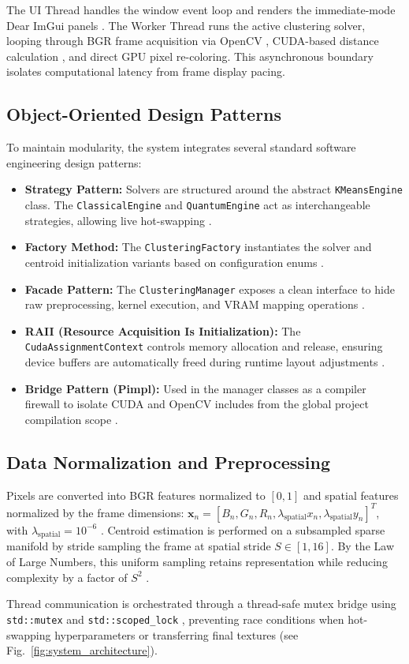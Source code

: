 The UI Thread handles the window event loop and renders the immediate-mode Dear ImGui panels \cite{ImGui}. The Worker Thread runs the active clustering solver, looping through BGR frame acquisition via OpenCV \cite{Bradski2000}, CUDA-based distance calculation \cite{CudaGuide}, and direct GPU pixel re-coloring. This asynchronous boundary isolates computational latency from frame display pacing.

\subsection{Object-Oriented Design Patterns}
To maintain modularity, the system integrates several standard software engineering design patterns:
\begin{itemize}
    \item \textbf{Strategy Pattern:} Solvers are structured around the abstract \texttt{KMeansEngine} class. The \texttt{ClassicalEngine} and \texttt{QuantumEngine} act as interchangeable strategies, allowing live hot-swapping \cite{gamma1995design}.
    \item \textbf{Factory Method:} The \texttt{ClusteringFactory} instantiates the solver and centroid initialization variants based on configuration enums \cite{gamma1995design}.
    \item \textbf{Facade Pattern:} The \texttt{ClusteringManager} exposes a clean interface to hide raw preprocessing, kernel execution, and VRAM mapping operations \cite{gamma1995design}.
    \item \textbf{RAII (Resource Acquisition Is Initialization):} The \texttt{CudaAssignmentContext} controls memory allocation and release, ensuring device buffers are automatically freed during runtime layout adjustments \cite{stroustrup2022tour}.
    \item \textbf{Bridge Pattern (Pimpl):} Used in the manager classes as a compiler firewall to isolate CUDA and OpenCV includes from the global project compilation scope \cite{meyers2014effective}.
\end{itemize}

\subsection{Data Normalization and Preprocessing}
Pixels are converted into BGR features normalized to $[0, 1]$ and spatial features normalized by the frame dimensions: $\mathbf{x}_n = [B_n, G_n, R_n, \lambda_{\text{spatial}} x_n, \lambda_{\text{spatial}} y_n]^T$, with $\lambda_{\text{spatial}} = 10^{-6}$ \cite{shi2000normalized, achanta2012slic}. Centroid estimation is performed on a subsampled sparse manifold by stride sampling the frame at spatial stride $S \in [1, 16]$. By the Law of Large Numbers, this uniform sampling retains representation while reducing complexity by a factor of $S^2$ \cite{mouton2020stride}.

Thread communication is orchestrated through a thread-safe mutex bridge using \texttt{std::mutex} and \texttt{std::scoped\_lock} \cite{williams2019c++}, preventing race conditions when hot-swapping hyperparameters or transferring final textures (see Fig.~\ref{fig:system_architecture}).
